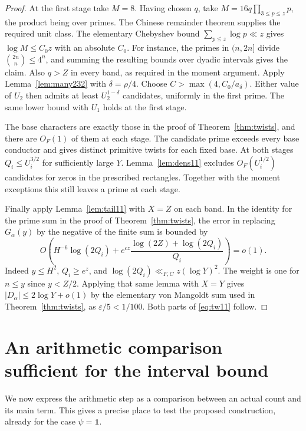 \documentclass[a4paper,11pt]{article}
\theoremstyle{definition}
\theoremstyle{remark}
\numberwithin{equation}{section}
\begin{document}
\begin{proof}
At the first stage take \(M=8\). Having chosen \(q\), take
\(M=16q\prod_{3\le p\le z}p\), the product being over primes.
The Chinese remainder theorem supplies the required unit class.
The elementary Chebyshev bound \(\sum_{p\le z}\log p\ll z\)
gives \(\log M\le C_0z\) with an absolute \(C_0\). For instance,
the primes in \((n,2n]\) divide \(\binom{2n}{n}\le4^n\), and
summing the resulting bounds over dyadic intervals gives the
claim. Also \(q>Z\) in every band, as required in the moment
argument. Apply Lemma~\ref{lem:many232} with \(\delta=\rho/4\).
Choose \(C>\max(4,C_0/a_\delta)\). Either value of \(U_2\)
then admits at least \(U_2^{1-\delta}\) candidates, uniformly in
the first prime. The same lower bound with \(U_1\) holds at
the first stage.

The base characters are exactly those in the proof of
Theorem~\ref{thm:twists}, and there are \(O_F(1)\) of them at
each stage. The candidate prime exceeds every base conductor
and gives distinct primitive twists for each fixed base.
At both stages \(Q_i\le U_i^{3/2}\) for sufficiently large \(Y\).
Lemma~\ref{lem:dens11} excludes \(O_F(U_i^{1/2})\) candidates
for zeros in the prescribed rectangles. Together with the moment
exceptions this still leaves a prime at each stage.

Finally apply Lemma~\ref{lem:tail11} with \(X=Z\) on each band.
In the identity for the prime sum in the proof of
Theorem~\ref{thm:twists}, the error in replacing \(G_\alpha(y)\)
by the negative of the finite sum is bounded by
\[
 O\!\left(H^{-6}\log(2Q_i)
       +e^{cz}\frac{\log(2Z)+\log(2Q_i)}{Q_i}\right)=o(1).
\]
Indeed \(y\le H^2\), \(Q_i\ge e^z\), and
\(\log(2Q_i)\ll_{F,C} z(\log Y)^2\). The weight is one for
\(n\le y\) since \(y<Z/2\). Applying that same lemma with
\(X=Y\) gives \(|D_\alpha|\le2\log Y+o(1)\) by the elementary
von Mangoldt sum used in Theorem~\ref{thm:twists}, as
\(\varepsilon/5<1/100\). Both parts of \eqref{eq:tw11} follow.
\end{proof}

\section{An arithmetic comparison sufficient for the interval bound}\label{nav:I-22}
\label{sec:comparison}

We now express the arithmetic step as a comparison between an actual count and its main term. This gives a precise place to test the proposed construction, already for the case \(\psi=\mathbf1\).
\end{document}
